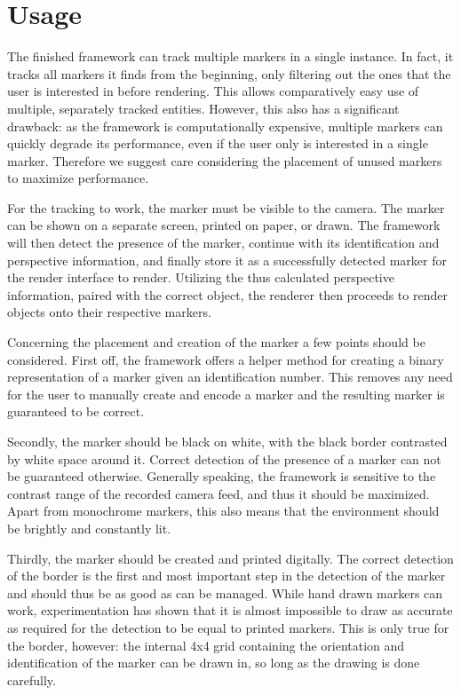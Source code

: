 \section{Usage}

The finished framework can track multiple markers in a single instance.
In fact, it tracks all markers it finds from the beginning, only filtering out the ones that the user is interested in before rendering.
This allows comparatively easy use of multiple, separately tracked entities.
However, this also has a significant drawback: as the framework is computationally expensive, multiple markers can quickly degrade its performance, even if the user only is interested in a single marker.
Therefore we suggest care considering the placement of unused markers to maximize performance.

For the tracking to work, the marker must be visible to the camera.
The marker can be shown on a separate screen, printed on paper, or drawn.
The framework will then detect the presence of the marker, continue with its identification and perspective information, and finally store it as a successfully detected marker for the render interface to render.
Utilizing the thus calculated perspective information, paired with the correct object, the renderer then proceeds to render objects onto their respective markers.

Concerning the placement and creation of the marker a few points should be considered.
First off, the framework offers a helper method for creating a binary representation of a marker given an identification number.
This removes any need for the user to manually create and encode a marker and the resulting marker is guaranteed to be correct.

Secondly, the marker should be black on white, with the black border contrasted by white space around it.
Correct detection of the presence of a marker can not be guaranteed otherwise.
Generally speaking, the framework is sensitive to the contrast range of the recorded camera feed, and thus it should be maximized.
Apart from monochrome markers, this also means that the environment should be brightly and constantly lit.

Thirdly, the marker should be created and printed digitally.
The correct detection of the border is the first and most important step in the detection of the marker and should thus be as good as can be managed.
While hand drawn markers can work, experimentation has shown that it is almost impossible to draw as accurate as required for the detection to be equal to printed markers.
This is only true for the border, however: the internal 4x4 grid containing the orientation and identification of the marker can be drawn in, so long as the drawing is done carefully.


